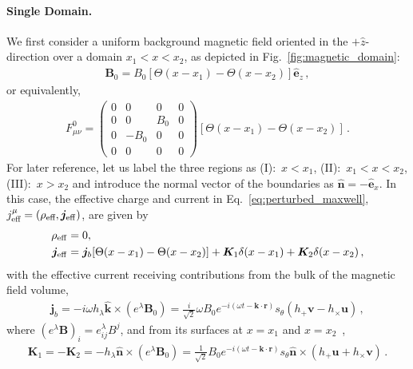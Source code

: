 \documentclass[a4paper,11pt]{article}
\begin{document}
\paragraph{Single Domain.} We first consider a uniform background magnetic field oriented in the $ + \hat{z} $-direction over a domain $ x_{1} < x < x_{2} $, as depicted in Fig.~\ref{fig:magnetic_domain}:
%
\begin{align}
    \bm{B}_{0} = B_{0} [ \Theta(x-x_{1}) - \Theta(x-x_{2}) ] \hat{\bm e}_{z} \,,
    \label{eq:magnetic_domain}
\end{align}
%
or equivalently,
%
\begin{align}
    F^0_{\mu\nu}
    = \begin{pmatrix}
      0 & 0 & 0 & 0 \\
      0 & 0 & B_{0} & 0 \\
      0 & -B_{0} & 0 & 0 \\
      0 & 0 & 0 & 0 
    \end{pmatrix} [ \Theta(x-x_{1}) - \Theta(x-x_{2}) ] \,.
\end{align}
%
For later reference, let us label the three regions as (I):~$x<x_1$, (II):~$x_1<x<x_2$, (III):~$x>x_2$ and introduce the normal vector of the boundaries as  $ \hat{\bm n} = -\hat{\bm e}_{x} $.
%
In this case, the effective charge and current in Eq.~\eqref{eq:perturbed_maxwell}, $j^\mu_\text{eff} = (\rho_\text{eff},  {\bm j}_{\rm eff})$, are given by
%
\begin{equation}
\begin{aligned}
    \rho_{\rm eff} & = 0, \\ 
    {\bm j}_{\rm eff} & = {\bm j}_{b} [\Theta(x-x_{1}) - \Theta(x-x_{2})] + {\bm K}_{1} \delta(x-x_{1}) +  {\bm K}_{2} \delta(x-x_{2}) \,, \label{eq:j_eff_magnetic_domain}
\end{aligned}
\end{equation}
%
with the effective current receiving contributions from the bulk of the magnetic field volume,
%
\begin{align}
    {\bm j}_{b} 
      = - i \omega h_{\lambda} \hat{\bm k} \times (e^{\lambda} {\bm B}_{0})  = \frac{i}{\sqrt{2}} \omega B_{0}  e^{- i (\omega t - \bm k \cdot {\bm r} )} s_{\theta} \left(  h_{+} \bm{v} - h_{\times} \bm{u}  \right)  \, , \label{eq:jb}
\end{align}
%
where $(e^\lambda {\bm B})_i = e_{ij}^\lambda B^j$,
and from its surfaces at $x = x_{1} $ and $ x=x_{2} $~\cite{Domcke:2023bat},
%
\begin{align}
    {\bm K}_{1}  = -{\bm K}_{2}
       =  - h_{\lambda} \hat{\bm n} \times (e^{\lambda} {\bm B}_{0}) = \frac{1}{\sqrt{2}}  B_{0} e^{- i (\omega t -  {\bm k} \cdot {\bm r} )} s_{\theta} \hat{\bm n} \times \left( h_{+} \bm{u} + h_{\times} \bm{v} \right) \, .
\end{align}
%
\end{document}
